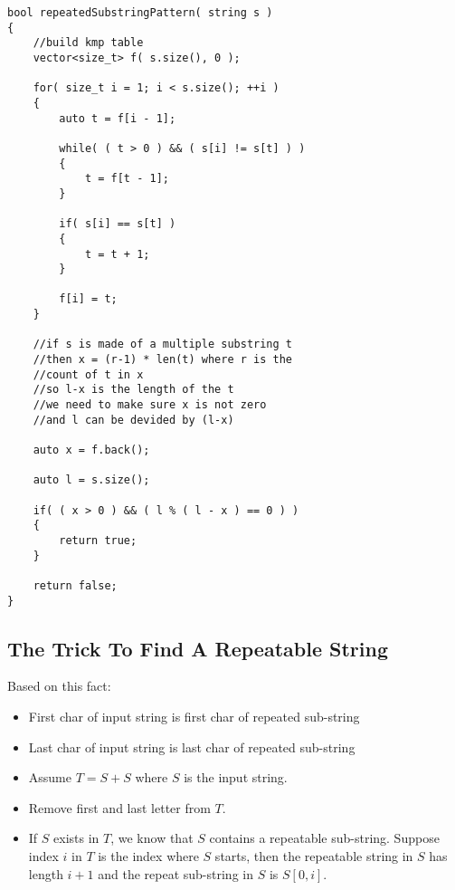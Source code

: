 \setcounter{lstlisting}{0}
\begin{lstlisting}[style=customc, caption={KMP}]
bool repeatedSubstringPattern( string s )
{
    //build kmp table
    vector<size_t> f( s.size(), 0 );

    for( size_t i = 1; i < s.size(); ++i )
    {
        auto t = f[i - 1];

        while( ( t > 0 ) && ( s[i] != s[t] ) )
        {
            t = f[t - 1];
        }

        if( s[i] == s[t] )
        {
            t = t + 1;
        }

        f[i] = t;
    }

    //if s is made of a multiple substring t
    //then x = (r-1) * len(t) where r is the
    //count of t in x
    //so l-x is the length of the t
    //we need to make sure x is not zero
    //and l can be devided by (l-x)

    auto x = f.back();

    auto l = s.size();

    if( ( x > 0 ) && ( l % ( l - x ) == 0 ) )
    {
        return true;
    }

    return false;
}
\end{lstlisting}

\subsection{The Trick To Find A Repeatable String}
Based on this fact:
\begin{itemize}
\item First char of input string is first char of repeated sub-string
\item Last char of input string is last char of repeated sub-string
\item Assume $T = S+S$ where $S$ is the input string.
\item Remove first and last letter from $T$.
\item If $S$ exists in $T$, we know that $S$ contains a repeatable sub-string. Suppose index $i$ in $T$ is the index where $S$ starts, then the repeatable string in $S$ has length $i+1$ and the repeat sub-string in $S$ is $S[0, i]$.
\end{itemize}